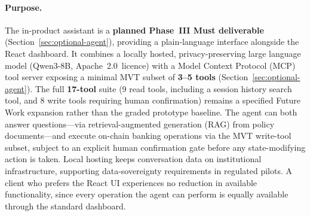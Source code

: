 \documentclass[12pt,a4paper]{report}
\begin{document}
\paragraph{Purpose.}
The in-product assistant is a \textbf{planned Phase~III Must deliverable} (Section~\ref{sec:optional-agent}), providing a plain-language interface alongside the React dashboard. It combines a locally hosted, privacy-preserving large language model (Qwen3-8B, Apache~2.0~licence) with a Model Context Protocol (MCP) tool server exposing a minimal MVT subset of \textbf{3--5 tools} (Section~\ref{sec:optional-agent}). The full \textbf{17-tool} suite (9 read tools, including a session history search tool, and 8 write tools requiring human confirmation) remains a specified Future Work expansion rather than the graded prototype baseline. The agent can both answer questions---via retrieval-augmented generation (RAG) from policy documents---and execute on-chain banking operations via the MVT write-tool subset, subject to an explicit human confirmation gate before any state-modifying action is taken. Local hosting keeps conversation data on institutional infrastructure, supporting data-sovereignty requirements in regulated pilots. A client who prefers the React UI experiences no reduction in available functionality, since every operation the agent can perform is equally available through the standard dashboard.
\end{document}
